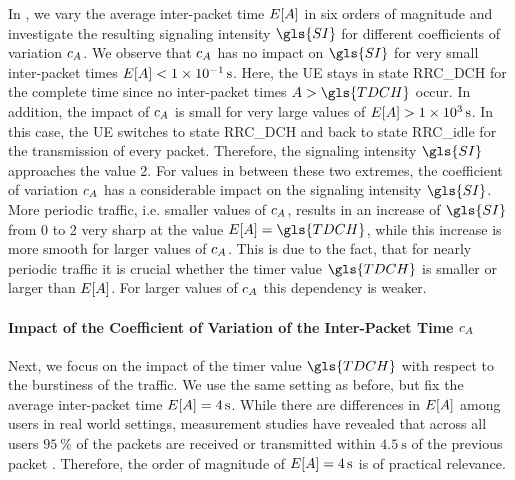 In , we vary the average inter-packet time \(E[A]\) in six orders of magnitude and investigate the resulting signaling intensity \(\gls{SI}\) for different coefficients of variation \(c_{A}\).
We observe that \(c_{A}\) has no impact on \(\gls{SI}\) for very small inter-packet times \(E[A]<\SI{1e-1}{\second}\).
Here, the \gls{UE} stays in state \gls{RRC_DCH} for the complete time since no inter-packet times \(\PacketIAT>\gls{TDCH}\) occur.
In addition, the impact of \(c_{A}\) is small for very large values of \(E[A]>\SI{1e3}{\second}\).
In this case, the \gls{UE} switches to state \gls{RRC_DCH} and back to state \gls{RRC_idle} for the transmission of every packet. Therefore, the signaling intensity \(\gls{SI}\) approaches the value 2.
For values in between these two extremes, the coefficient of variation \(c_{A}\) has a considerable impact on the signaling intensity \(\gls{SI}\).
More periodic traffic, i.e. smaller values of \(c_{A}\), results in an increase of \(\gls{SI}\)from 0 to 2 very sharp at the value \(E[\PacketIAT]=\gls{TDCH}\), while this increase is more smooth for larger values of \(c_{A}\).
This is due to the fact, that for nearly periodic traffic it is crucial whether the timer value \(\gls{TDCH}\) is smaller or larger than \(E[A]\). 
For larger values of \(c_{A}\) this dependency is weaker.

\paragraph*{Impact of the Coefficient of Variation of the Inter-Packet Time \(c_A\)}

Next, we focus on the impact of the timer value \(\gls{TDCH}\) with respect to the burstiness of the traffic.
We use the same setting as before, but fix the average inter-packet time \(E[A]=\SI{4}{\second}\).
While there are differences in \(E[A]\) among users in real world settings, measurement studies have revealed that across all users \(\SI{95}{\percent}\) of the packets are received or transmitted within \(\SI{4.5}{\second}\) of the previous packet \cite{Falaki2010a}.
Therefore, the order of magnitude of \(E[A]=\SI{4}{\second}\) is of practical relevance. 

